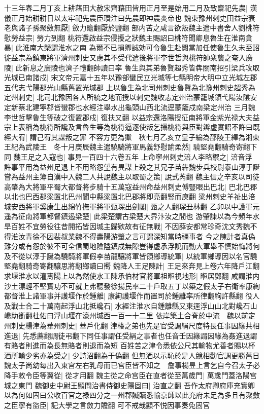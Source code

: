 十三年春二月丁亥上耕藉田大赦宋齊藉田皆用正月至是始用二月及致齋祀先農|{
	漢儀正月始耕耕日以太牢祀先農臣瓚注曰先農即神農炎帝也}
魏東豫州刺史田益宗衰老與諸子孫聚斂無厭|{
	斂力贍翻厭於鹽翻}
部内苦之咸言欲叛魏主遣中書舍人劉桃符慰勞益宗|{
	勞力到翻}
桃符還啟益宗侵擾之狀魏主賜詔曰桃符聞卿息魯生在淮南貪暴|{
	此淮南大槩謂淮水之南}
為爾不已損卿誠効可令魯生赴闕當加任使魯生久未至詔徙益宗為鎮東將軍濟州刺史又慮其不受代遣後將軍李世哲與桃符帥衆襲之奄入廣陵|{
	此新息之廣陵也濟子禮翻帥讀曰率}
魯生與其弟魯賢超秀皆犇關南招引梁兵攻取光城已南諸戍|{
	宋文帝元嘉十五年以豫部蠻民立光城等七縣明帝大明中立光城左郡五代志弋陽郡光山縣舊置光城郡}
上以魯生為北司州刺史魯賢為北豫州刺史超秀為定州刺史|{
	北司北豫因各人所統之地而授以刺史魏收志定州治蒙籠城領弋陽汝隂安定新蔡北建寜郡皆蠻郡也水經注舉水出龜頭山西北流逕蒙籠戍南梁定州治}
三月魏李世哲擊魯生等破之復置郡戍|{
	復扶又翻}
以益宗還洛陽授征南將軍金紫光禄大夫益宗上表稱為桃符所讒及言魯生等為桃符逼逐使叛乞攝桃符與臣對辯虚實詔不許曰既經大宥|{
	謂己宥其謀叛之罪}
不容方更為獄　秋七月乙亥立皇子綸為邵陵王繹為湘東王紀為武陵王　冬十月庚辰魏主遣驍騎將軍馬義舒慰諭柔然|{
	驍堅堯翻騎奇寄翻下同}
魏王足之入寇也|{
	事見一百四十六卷五年}
上命寧州刺史涪人李略禦之|{
	涪音浮}
許事平用為益州足退上不用略怨望有異謀上殺之其兄子苗犇魏步兵校尉泰山淳于誕嘗為益州主簿自漢中入魏二人共說魏主以取蜀之策|{
	說式芮翻}
魏主信之辛亥以司徒高肇為大將軍平蜀大都督將步騎十五萬寇益州命益州刺史傅豎眼出巴北|{
	巴北巴郡以北也巴西郡梁置北巴州閬中縣梁置北巴郡將即亮翻豎而庾翻}
梁州刺史羊祉出涪城安西將軍奚康生出綿竹撫軍將軍甄琛出劍閣|{
	甄之人翻琛丑林翻}
乙卯以中護軍元遥為征南將軍都督鎮遏梁楚|{
	此梁楚謂古梁楚大界汴汝之間也}
游肇諫以為今頻年水旱百姓不宜勞役往昔開拓皆因城主歸欵故有征無戰|{
	不因薛安都常珍奇沈文秀魏不得淮汝青徐不因裴叔業魏不得夀陽游肇之言可謂深知當時疆事者}
今之陳計者真偽難分或有怨於彼不可全信蜀地險隘鎮戍無隙豈得虚承浮說而動大軍舉不慎始悔將何及不從以淳于誕為驍騎將軍假李苗龍驤將軍皆領鄉導統軍|{
	以統軍鄉導因以名官驍堅堯翻騎奇寄翻驤思將翻鄉讀曰嚮}
魏降人王足陳計|{
	王足來奔見上卷六年降戶江翻}
求堰淮水以灌夀陽上以為然使水工陳承伯材官將軍祖暅視地形|{
	暅居鄧翻}
咸謂淮内沙土漂輕不堅實功不可就上弗聽發徐揚民率二十戶取五丁以築之假太子右衛率康絢都督淮上諸軍事并護堰作於鍾離|{
	康絢護堰作而置司於鍾離率所律翻絢許縣翻}
役人及戰士合二十萬南起浮山北抵巉石|{
	水經注淮水自鍾離縣又東逕浮山山北對巉石山巉助銜翻杜佑曰浮山堰在濠州城西一百一十二里}
依岸築土合脊於中流　魏以前定州刺史楊津為華州刺史|{
	華戶化翻}
津椿之弟也先是官受調絹尺度特長任事因緣共相進退|{
	先悉薦翻調徒弔翻下同任事謂任受絹之事者也任音壬因緣謂因緣為姦進退謂有賂者則進而為長無賂者則退而為短}
百姓苦之津令悉依公尺其輸物尤善者賜以杯酒所輸少劣亦為受之|{
	少詩沼翻為于偽翻}
但無酒以示恥於是人競相勸官調更勝舊日　魏太子尚幼每出入東宫左右乳母而已宫臣皆不知之　詹事楊昱上言乞自今召太子必降手敕令臣等翼從|{
	從才用翻}
魏主從之命宫臣在直者從至萬歲門|{
	萬歲門蓋洛陽宫城之東門}
魏御史中尉王顯問治書侍御史陽固曰|{
	治直之翻}
吾作太府卿府庫充實卿以為何如固曰公收百官之禄四分之一州郡贓贖悉輸京師以此充府未足為多且有聚斂之臣寧有盜臣|{
	記大學之言斂力贍翻}
可不戒哉顯不悦因事奏免固官

